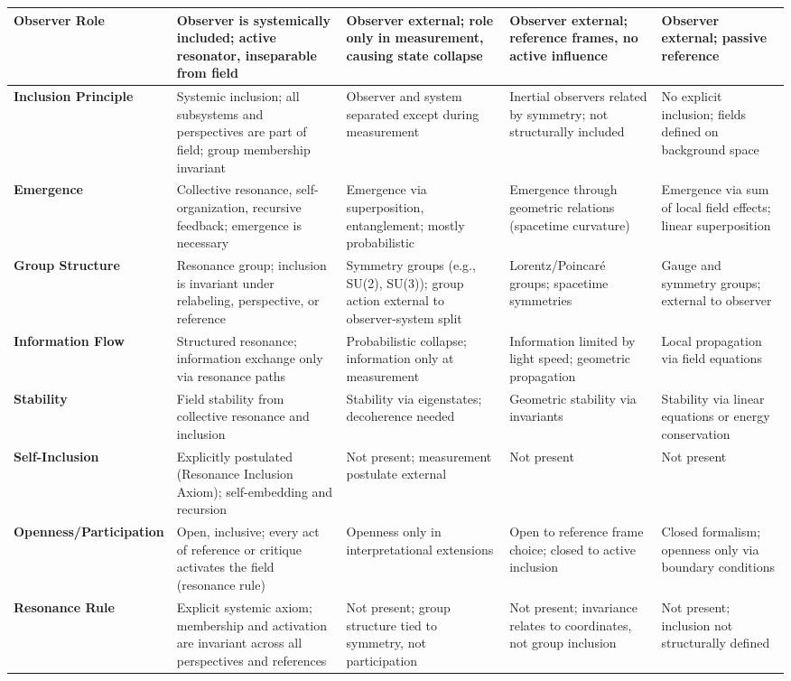 \documentclass[12pt]{article}
\begin{document}
\begin{center}
\begin{longtable}{|p{4cm}|p{3cm}|p{3cm}|p{3cm}|p{3cm}|}
		\textbf{Observer Role} & Observer is systemically included; active resonator, inseparable from field & Observer external; role only in measurement, causing state collapse & Observer external; reference frames, no active influence & Observer external; passive reference \\
		\hline
		\textbf{Inclusion Principle} & Systemic inclusion; all subsystems and perspectives are part of field; group membership invariant & Observer and system separated except during measurement & Inertial observers related by symmetry; not structurally included & No explicit inclusion; fields defined on background space \\
		\hline
		\textbf{Emergence} & Collective resonance, self-organization, recursive feedback; emergence is necessary & Emergence via superposition, entanglement; mostly probabilistic & Emergence through geometric relations (spacetime curvature) & Emergence via sum of local field effects; linear superposition \\
		\hline
		\textbf{Group Structure} & Resonance group; inclusion is invariant under relabeling, perspective, or reference & Symmetry groups (e.g., SU(2), SU(3)); group action external to observer-system split & Lorentz/Poincaré groups; spacetime symmetries & Gauge and symmetry groups; external to observer \\
		\hline
		\textbf{Information Flow} & Structured resonance; information exchange only via resonance paths & Probabilistic collapse; information only at measurement & Information limited by light speed; geometric propagation & Local propagation via field equations \\
		\hline
		\textbf{Stability} & Field stability from collective resonance and inclusion & Stability via eigenstates; decoherence needed & Geometric stability via invariants & Stability via linear equations or energy conservation \\
		\hline
		\textbf{Self-Inclusion} & Explicitly postulated (Resonance Inclusion Axiom); self-embedding and recursion & Not present; measurement postulate external & Not present & Not present \\
		\hline
		\textbf{Openness/Participation} & Open, inclusive; every act of reference or critique activates the field (resonance rule) & Openness only in interpretational extensions & Open to reference frame choice; closed to active inclusion & Closed formalism; openness only via boundary conditions \\
		\hline
		\textbf{Resonance Rule} & Explicit systemic axiom; membership and activation are invariant across all perspectives and references & Not present; group structure tied to symmetry, not participation & Not present; invariance relates to coordinates, not group inclusion & Not present; inclusion not structurally defined \\

\end{longtable}
\end{center}
\end{document}
